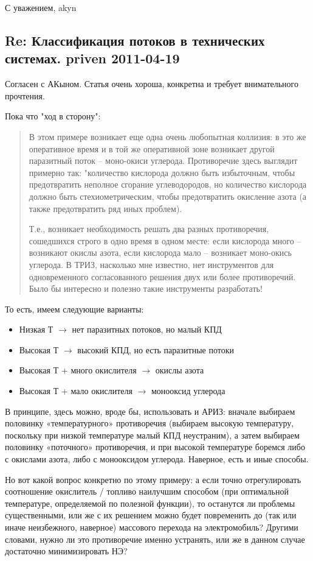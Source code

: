 \documentclass[a4paper,11pt]{article}
\begin{document}
С уважением, akyn

\subsection*{Re: Классификация потоков в технических системах. priven
  2011-04-19} 

Согласен с АКыном. Статья очень хороша, конкретна и требует внимательного
прочтения.

Пока что "ход в сторону":
\begin{quote}
  В этом примере возникает еще одна очень любопытная коллизия: в это же
  оперативное время и в той же оперативной зоне возникает другой паразитный
  поток -- моно-окиси углерода. Противоречие здесь выглядит примерно так:
  "количество кислорода должно быть избыточным, чтобы предотвратить неполное
  сгорание углеводородов, но количество кислорода должно быть
  стехиометрическим, чтобы предотвратить окисление азота (а также
  предотвратить ряд иных проблем).

  Т.е., возникает необходимость решать два разных противоречия, сошедшихся
  строго в одно время в одном месте: если кислорода много -- возникают окислы
  азота, если кислорода мало -- возникает моно-окись углерода. В ТРИЗ,
  насколько мне известно, нет инструментов для одновременного согласованного
  решения двух или более противоречий. Было бы интересно и полезно такие
  инструменты разработать!
\end{quote}

То есть, имеем следующие варианты:
\begin{itemize}
\item Низкая Т $\to$ нет паразитных потоков, но малый КПД
\item Высокая Т $\to$ высокий КПД, но есть паразитные потоки
\item Высокая Т + много окислителя $\to$ окислы азота
\item Высокая Т + мало окислителя $\to$ монооксид углерода
\end{itemize}
В принципе, здесь можно, вроде бы, использовать и АРИЗ: вначале выбираем
половинку «температурного» противоречия (выбираем высокую температуру,
поскольку при низкой температуре малый КПД неустраним), а затем выбираем
половинку «поточного» противоречия, и при высокой температуре боремся либо с
окислами азота, либо с монооксидом углерода. Наверное, есть и иные способы.

Но вот какой вопрос конкретно по этому примеру: а если точно отрегулировать
соотношение окислитель / топливо наилучшим способом (при оптимальной
температуре, определяемой по полезной функции), то останутся ли проблемы
существенными, или же с их решением можно будет повременить до (так или иначе
неизбежного, наверное) массового перехода на электромобиль? Другими словами,
нужно ли это противоречие именно устранять, или же в данном случае достаточно
минимизировать НЭ?
\end{document}
